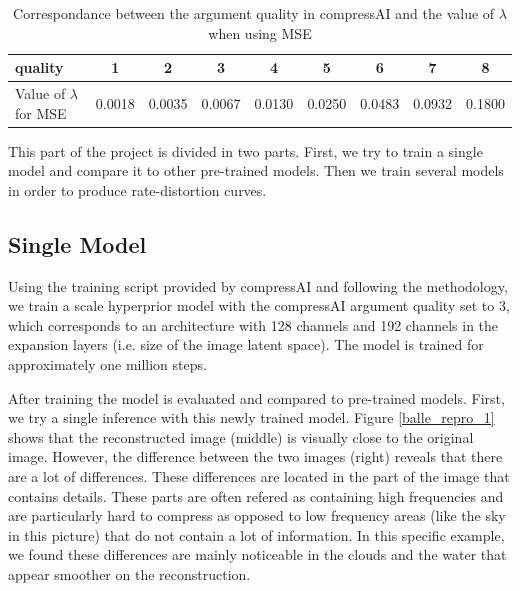 \begin{table}[]
    \centering
    \begin{tabular}{|l|c|c|c|c|c|c|c|c|}
    \hline
    \textsf{quality}                      & 1 & 2 & 3 & 4 & 5 & 6 & 7 & 8 \\ \hline
    Value of \(\lambda\) for MSE & 0.0018 & 0.0035 & 0.0067 & 0.0130 & 0.0250 & 0.0483 & 0.0932 & 0.1800 \\ \hline
    \end{tabular}
    \caption{Correspondance between the argument \textsf{quality} in compressAI and the value of \(\lambda\) when using MSE}
    \label{tab}
\end{table}

This part of the project is divided in two parts. First, we try to train a single model and compare it to other pre-trained models. Then we train several models in order to produce rate-distortion curves.

\subsection{Single Model}
Using the training script provided by compressAI and following the methodology, we train a scale hyperprior model with the compressAI argument \textsf{quality} set to 3, which corresponds to an architecture with 128 channels and 192 channels in the expansion layers (i.e. size of the image latent space). The model is trained for approximately one million steps.

After training the model is evaluated and compared to pre-trained models. First, we try a single inference with this newly trained model. Figure \ref{balle_repro_1} shows that the reconstructed image (middle) is visually close to the original image. However, the difference between the two images (right) reveals that there are a lot of differences. These differences are located in the part of the image that contains details. These parts are often refered as containing high frequencies and are particularly hard to compress as opposed to low frequency areas (like the sky in this picture) that do not contain a lot of information. In this specific example, we found these differences are mainly noticeable in the clouds and the water that appear smoother on the reconstruction.


